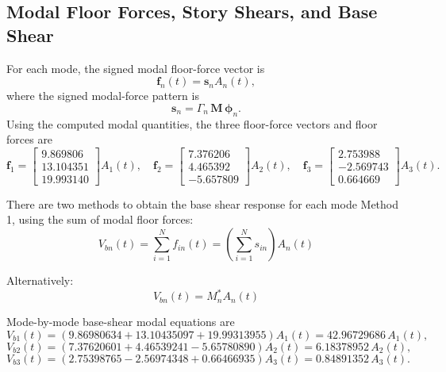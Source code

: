 \documentclass[11pt,a4paper]{article}
\begin{document}
\subsection{Modal Floor Forces, Story Shears, and Base Shear}
For each mode, the signed modal floor-force vector is
\begin{equation}
\mathbf{f}_n(t)=\mathbf{s}_nA_n(t),
\end{equation}
where the signed modal-force pattern is
\begin{equation}
\mathbf{s}_n=\Gamma_n\,\mathbf{M}\,\boldsymbol{\phi}_n.
\end{equation}
Using the computed modal quantities, the three floor-force vectors and floor forces are
\begin{equation}
\mathbf{f}_1=\begin{bmatrix}9.869806\\13.104351\\19.993140\end{bmatrix}A_1(t),\quad
\mathbf{f}_2=\begin{bmatrix}7.376206\\4.465392\\-5.657809\end{bmatrix}A_2(t),\quad
\mathbf{f}_3=\begin{bmatrix}2.753988\\-2.569743\\0.664669\end{bmatrix}A_3(t).
\end{equation}

There are two methods to obtain the base shear response for each mode
Method 1, using the sum of modal floor forces:
\begin{equation}
V_{bn}(t)=\sum_{i=1}^{N}f_{in}(t)=\left(\sum_{i=1}^{N}s_{in}\right)A_n(t)
\end{equation}

Alternatively:
\begin{equation}
V_{bn}(t)=M_n^*A_n(t)
\end{equation}

Mode-by-mode base-shear modal equations are
\begin{equation}
V_{b1}(t)=\left(9.86980634+13.10435097+19.99313955\right)A_1(t)=42.96729686\,A_1(t),
\end{equation}
\begin{equation}
V_{b2}(t)=\left(7.37620601+4.46539241-5.65780890\right)A_2(t)=6.18378952\,A_2(t),
\end{equation}
\begin{equation}
V_{b3}(t)=\left(2.75398765-2.56974348+0.66466935\right)A_3(t)=0.84891352\,A_3(t).
\end{equation}
\end{document}
